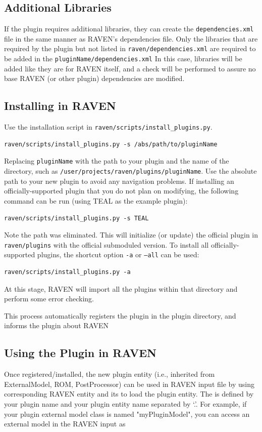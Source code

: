 \subsection{Additional Libraries}
If the plugin requires additional libraries, they can create the \texttt{dependencies.xml} file in
the same manner as RAVEN's dependencies file. Only the libraries that are required by
the plugin but not listed in \texttt{raven/dependencies.xml} are required to be added in the \texttt{pluginName/dependencies.xml}
In this case, libraries will be added like they are for RAVEN
itself, and a check will be performed to assure no base RAVEN (or other plugin) dependencies are
modified.

\subsection{Installing in RAVEN}
Use the installation script in \texttt{raven/scripts/install\_plugins.py}.
\begin{lstlisting}[morekeywords={examplePlugin, pluginInstallation}]
  raven/scripts/install_plugins.py -s /abs/path/to/pluginName
\end{lstlisting}
Replacing \texttt{pluginName} with the path to your plugin and the name of the directory, such as
\texttt{/user/projects/raven/plugins/pluginName}.
Use the absolute path to your new plugin to avoid any navigation problems.
If installing an officially-supported plugin that you do not plan on modifying, the following command
can be run (using TEAL as the example plugin):
\begin{lstlisting}[morekeywords={examplePlugin, TEALInstallation}]
  raven/scripts/install_plugins.py -s TEAL
\end{lstlisting}
Note the path was eliminated. This will initialize (or update) the official plugin in
\texttt{raven/plugins} with the official submoduled version.
To install all officially-supported plugins, the shortcut option \texttt{-a} or \texttt{--all} can be used:
\begin{lstlisting}[morekeywords={examplePlugin, installAllPlugin}]
  raven/scripts/install_plugins.py -a
\end{lstlisting}
At this stage, RAVEN will import all the plugins within that directory and perform some error checking.

This process automatically registers the plugin in the plugin directory, and informs the plugin
about RAVEN %

\subsection{Using the Plugin in RAVEN}
Once registered/installed, the new plugin entity (i.e., inherited from ExternalModel, ROM, PostProcessor) can be used in RAVEN input file by
using corresponding RAVEN entity and its  to load the plugin entity. The  is defined by your plugin name and your
plugin entity name separated by `.'.
For example, if your plugin external model class is named "myPluginModel",
you can access an external model in the RAVEN input as

